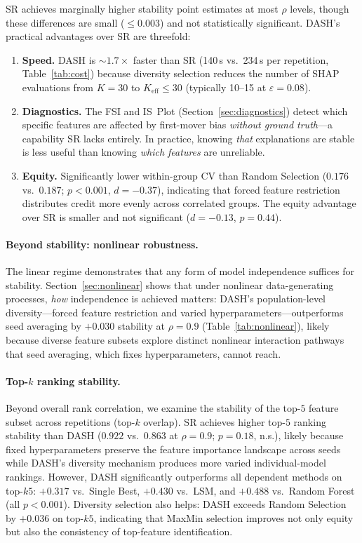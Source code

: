\documentclass[11pt]{article}
\newcommand{\dash}{\textsc{DASH}}
\newcommand{\rhovar}{\rho}
\begin{document}
SR achieves marginally higher stability point estimates at most
$\rhovar$ levels, though these differences are small ($\leq 0.003$) and
not statistically significant.  \dash{}'s practical advantages over SR
are threefold:
\begin{enumerate}
  \item \textbf{Speed.} \dash{} is ${\sim}1.7\times$ faster than SR (140\,s
    vs.\ 234\,s per repetition, Table~\ref{tab:cost}) because diversity
    selection reduces the number of SHAP evaluations from $K = 30$ to
    $K_{\text{eff}} \leq 30$ (typically 10--15 at $\varepsilon = 0.08$).
  \item \textbf{Diagnostics.} The FSI and IS~Plot
    (Section~\ref{sec:diagnostics}) detect which specific features are
    affected by first-mover bias \emph{without ground truth}---a
    capability SR lacks entirely. In practice, knowing \emph{that}
    explanations are stable is less useful than knowing \emph{which
    features} are unreliable.
  \item \textbf{Equity.} Significantly lower within-group CV than
    Random Selection ($0.176$ vs.\ $0.187$; $p < 0.001$, $d = -0.37$),
    indicating that forced feature restriction distributes credit more
    evenly across correlated groups. The equity advantage over SR is
    smaller and not significant ($d = -0.13$, $p = 0.44$).
\end{enumerate}

\paragraph{Beyond stability: nonlinear robustness.}
The linear regime demonstrates that any form of model independence
suffices for stability. Section~\ref{sec:nonlinear} shows that under
nonlinear data-generating processes, \emph{how} independence is achieved
matters: \dash{}'s population-level diversity---forced feature restriction
and varied hyperparameters---outperforms seed averaging by $+0.030$
stability at $\rhovar = 0.9$ (Table~\ref{tab:nonlinear}), likely because
diverse feature subsets explore distinct nonlinear interaction pathways
that seed averaging, which fixes hyperparameters, cannot reach.

\paragraph{Top-$k$ ranking stability.}
Beyond overall rank correlation, we examine the stability of the top-$5$
feature subset across repetitions (top-$k$ overlap). SR achieves higher
top-$5$ ranking stability than \dash{} ($0.922$ vs.\ $0.863$ at
$\rhovar = 0.9$; $p = 0.18$, n.s.), likely because fixed hyperparameters
preserve the feature importance landscape across seeds while \dash{}'s
diversity mechanism produces more varied individual-model rankings.
However, \dash{} significantly outperforms all dependent methods on
top-$k5$: $+0.317$ vs.\ Single Best, $+0.430$ vs.\ LSM, and $+0.488$
vs.\ Random Forest (all $p < 0.001$). Diversity selection also helps:
\dash{} exceeds Random Selection by $+0.036$ on top-$k5$, indicating
that MaxMin selection improves not only equity but also the consistency
of top-feature identification.
\end{document}
